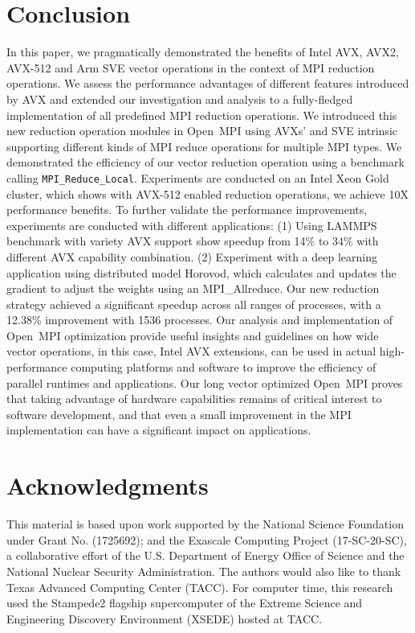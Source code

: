 \documentclass[5p,times,twocolumn]{elsarticle}
\newcommand{\mpifunc}[1]{\lstinline"MPI_#1"\xspace}
\newcommand{\ompi}[0]{Open~MPI\xspace}
\newcommand{\mpi}[0]{\textsc{MPI}\xspace}
\begin{document}
\section{Conclusion}\label{sec:conclusion}
In this paper, we pragmatically demonstrated the benefits of Intel
AVX, AVX2, AVX-512 and Arm SVE vector operations in the context of MPI reduction
operations. We assess the performance advantages of different features
introduced by AVX and extended our investigation and analysis to a
fully-fledged implementation of all predefined MPI reduction
operations.
%
We introduced this new reduction operation modules in \ompi using AVXs'
and SVE intrinsic supporting different kinds of \mpi reduce operations for
multiple \mpi types. We demonstrated the efficiency of our vector
reduction operation using a benchmark calling
\mpifunc{Reduce_Local}. Experiments are conducted on an Intel Xeon
Gold cluster, which shows with AVX-512 enabled reduction operations, we
achieve 10X performance benefits.
%
To further validate the performance improvements, experiments are
conducted with different applications: (1) Using LAMMPS benchmark with variety AVX
support show speedup from 14\% to 34\% with different AVX capability combination.
(2) Experiment with a deep learning application
using distributed model Horovod, which calculates and updates the
gradient to adjust the weights using an MPI\_Allreduce.  Our new
reduction strategy achieved a significant speedup across all ranges of
processes, with a 12.38\% improvement with 1536 processes.  Our
analysis and implementation of \ompi optimization provide useful
insights and guidelines on how wide vector operations, in this case,
Intel AVX extensions, can be used in actual high-performance computing
platforms and software to improve the efficiency of parallel runtimes
and applications.
%
Our long vector optimized \ompi proves that taking advantage of hardware
capabilities remains of critical interest to software development, and
that even a small improvement in the MPI implementation can have
a significant impact on applications.

\section*{Acknowledgments}
%
This material is based upon work supported by the National Science Foundation under Grant No. (1725692); and the Exascale Computing Project (17-SC-20-SC), a collaborative effort of the
U.S. Department of Energy Office of Science and the National Nuclear Security Administration.
The authors would also like to thank
Texas Advanced Computing Center (TACC). For computer time, this research used
the Stampede2 flagship supercomputer of the Extreme Science and Engineering Discovery Environment (XSEDE) hosted at TACC.

\balance

%
%


\end{document}
